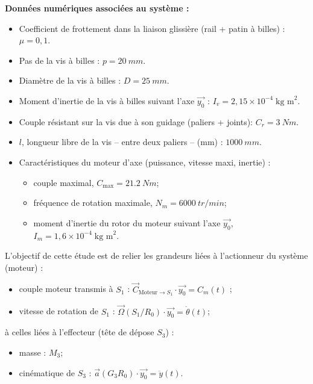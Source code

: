 \begin{multicols}{2}
\textbf{Données numériques associées au système :}
\begin{itemize}
\item Coefficient de frottement dans la liaison glissière (rail + patin à billes) : $\mu = 0,1$.
\item Pas de la vis à billes : $p = \SI{20}{mm}$.
\item Diamètre de la vis à billes : $D =\SI{25}{mm}$.
\item Moment d'inertie de la vis à billes suivant l'axe $\overrightarrow{y_0}$ : $I_v = 2,15 \times 10^{-4}\;\text{kg m}^2$.
\item Couple résistant sur la vis due à son guidage (paliers + joints): $C_r = \SI{3}{Nm}$.
\item $l$, longueur libre de la vis -- entre deux paliers -- (mm) : $\SI{1000}{mm}$.
\item Caractéristiques du moteur d'axe (puissance, vitesse maxi, inertie) :
\begin{itemize}
\item couple maximal, $C_{\text{max}} = \SI{21,2}{Nm}$;
\item fréquence de rotation maximale, $N_m = \SI{6000}{tr/min}$;
\item moment d'inertie du rotor du moteur suivant l'axe $\overrightarrow{y_0}$, $I_m = 1,6 \times 10^{-4}\;\text{kg m}^2$.
\end{itemize}

\end{itemize}

\clearpage



\begin{obj}
L'objectif de cette étude est de relier les grandeurs liées à l'actionneur du système (moteur) :
\begin{itemize}
\item couple moteur transmis à $S_1$ : $\overrightarrow{C}_{\text{Moteur}\to S_1}\cdot \overrightarrow{y_0}=C_m(t)$ ;
\item vitesse de rotation de $S_1$ : $\overrightarrow{\Omega}(S_1/R_0)\cdot \overrightarrow{y_0}=\dot{\theta}(t)$;
\end{itemize} 
à celles liées à l'effecteur (tête de dépose $S_3$) : 
\begin{itemize}
\item masse : $M_3$;
\item cinématique de $S_3$ : $\overrightarrow{a}(G_3R_0)\cdot \overrightarrow{y_0}=\ddot{y}(t)$.
\end{itemize}
\end{obj}





\end{multicols}
